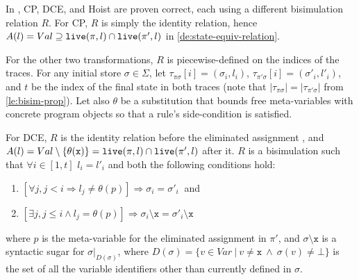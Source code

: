 \begin{myproof}
In \cite{Lacey04}, CP, DCE, and Hoist are proven correct, each using a different bisimulation relation $R$. 
For CP, $R$ is simply the identity relation, hence $A(l)=Val\supseteq \text{${\tt live}$}(\pi,l)\cap \text{${\tt live}$}(\pi',l)$ in \mydefinition\ref{de:state-equiv-relation}.

For the other two transformations, $R$ is piecewise-defined on the indices of the traces. For any initial store $\sigma\in \Sigma$, let $\tau_{\pi\sigma}[i]=(\sigma_i,l_i)$, $\tau_{\pi'\sigma}[i]=(\sigma'_i,l'_i)$, and $t$ be the index of the final state in both traces (note that $|\tau_{\pi\sigma}|=|\tau_{\pi'\sigma}|$ from \ref{le:bisim-prop}). Let also $\theta$ be a substitution that bounds free meta-variables with concrete program objects so that a rule's side-condition is satisfied.

For DCE, $R$ is the identity relation before the eliminated assignment , and $A(l)=Val\setminus\{\theta(\text{${\tt x}$})\}=\text{${\tt live}$}(\pi,l)\cap \text{${\tt live}$}(\pi',l)$ after it. $R$ is a bisimulation such that $\forall i\in[1,t]$ $l_i=l'_i$ and both the following conditions hold:
\begin{enumerate}
 \item $[\forall j, j<i \Rightarrow l_j\neq \theta(p)] \Rightarrow \sigma_i=\sigma'_i~$ and
 \item $[\exists j, j\leq i \wedge l_j = \theta(p)] \Rightarrow \sigma_i\setminus\texttt{x}=\sigma'_i\setminus\texttt{x}$
\end{enumerate}
\noindent where $p$ is the meta-variable for the eliminated assignment in $\pi'$, and $\sigma\setminus\texttt{x}$ is a syntactic sugar for $\sigma\vert_{D(\sigma)}$, where $D(\sigma)=\{v\in Var ~|~ v\neq \texttt{x} ~\wedge~ \sigma(v)\neq\bot\}$ is the set of all the variable identifiers other than  currently defined in $\sigma$.


\end{myproof}

